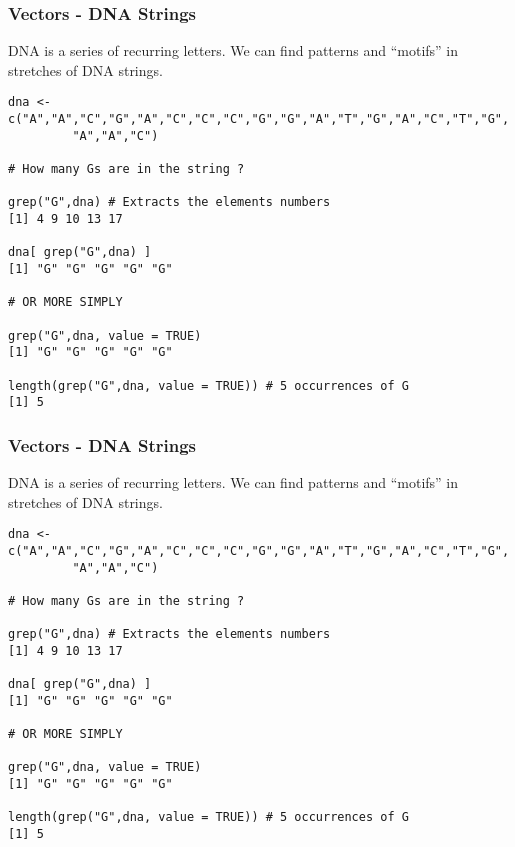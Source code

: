 \documentclass{beamer}
\begin{document}
%


\begin{frame}[fragile]
\frametitle{Vectors - DNA Strings}
DNA is a series of recurring letters. We can find patterns and ``motifs'' in stretches of DNA
strings. 
\scriptsize
\begin{verbatim}
dna <- c("A","A","C","G","A","C","C","C","G","G","A","T","G","A","C","T","G",
         "A","A","C")

# How many Gs are in the string ? 

grep("G",dna) # Extracts the elements numbers
[1] 4 9 10 13 17

dna[ grep("G",dna) ]
[1] "G" "G" "G" "G" "G"

# OR MORE SIMPLY
 
grep("G",dna, value = TRUE)
[1] "G" "G" "G" "G" "G"

length(grep("G",dna, value = TRUE)) # 5 occurrences of G
[1] 5
\end{verbatim}
\end{frame}

\begin{frame}[fragile]
\frametitle{Vectors - DNA Strings}
DNA is a series of recurring letters. We can find patterns and ``motifs'' in stretches of DNA
strings. 
\scriptsize
\begin{verbatim}
dna <- c("A","A","C","G","A","C","C","C","G","G","A","T","G","A","C","T","G",
         "A","A","C")

# How many Gs are in the string ? 

grep("G",dna) # Extracts the elements numbers
[1] 4 9 10 13 17

dna[ grep("G",dna) ]
[1] "G" "G" "G" "G" "G"

# OR MORE SIMPLY
 
grep("G",dna, value = TRUE)
[1] "G" "G" "G" "G" "G"

length(grep("G",dna, value = TRUE)) # 5 occurrences of G
[1] 5
\end{verbatim}
\end{frame}
\end{document}
